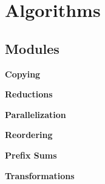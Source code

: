 \section{Algorithms}
\label{group__algorithms}
\subsection*{Modules}
\begin{CompactItemize}
\item 
{\bf Copying}
\item 
{\bf Reductions}
\item 
{\bf Parallelization}
\item 
{\bf Reordering}
\item 
{\bf Prefix Sums}
\item 
{\bf Transformations}
\end{CompactItemize}
